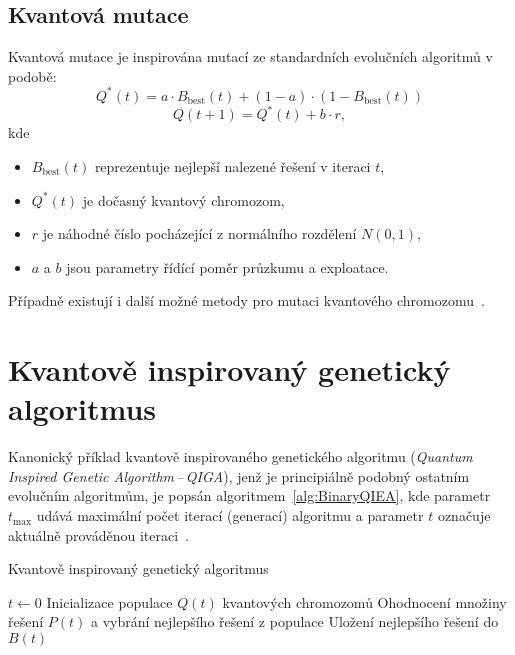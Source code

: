 \subsection{Kvantová mutace}\label{subsec:quantum-mutation}
Kvantová mutace je inspirována mutací ze standardních evolučních algoritmů v podobě:
\begin{equation*}
    Q^*\left(t\right) = a \cdot B_{\text{best}}\left(t\right) + (1 - a) \cdot (1 - B_{\text{best}}\left(t\right))
\end{equation*}
\begin{equation*}
    Q\left(t+1\right) = Q^*\left(t\right) + b \cdot r,
\end{equation*}
kde
\begin{itemize}
    \item $B_{\text{best}}\left(t\right)$ reprezentuje nejlepší nalezené řešení v iteraci $t$,
    \item $Q^*\left(t\right)$ je dočasný kvantový chromozom,
    \item $r$ je náhodné číslo pocházející z normálního rozdělení $N\left(0,1\right)$,
    \item $a$ a $b$ jsou parametry řídící poměr průzkumu a exploatace.
\end{itemize}
Případně existují i další možné metody pro mutaci kvantového chromozomu~\cite{NaturalComputing}.

\section{Kvantově inspirovaný genetický algoritmus}\label{sec:qiga}
Kanonický příklad kvantově inspirovaného genetického algoritmu (\emph{Quantum Inspired Genetic Algorithm\,--\,QIGA}), jenž je principiálně podobný ostatním evolučním algoritmům, je popsán algoritmem~\ref{alg:BinaryQIEA}, kde parametr $t_{\text{max}}$ udává maximální počet iterací (generací) algoritmu a parametr $t$ označuje aktuálně prováděnou iteraci~\cite{NaturalComputing}. 

\begin{algorithm}[ht]
    \caption{Kvantově inspirovaný genetický algoritmus~\cite{NaturalComputing}}
    \label{alg:BinaryQIEA}
    $t \gets 0$\;
    Inicializace populace $Q\left(t\right)$ kvantových chromozomů\;
    Ohodnocení množiny řešení $P\left(t\right)$ a vybrání nejlepšího řešení z populace\;
    Uložení nejlepšího řešení do $B\left(t\right)$\;
\end{algorithm}

